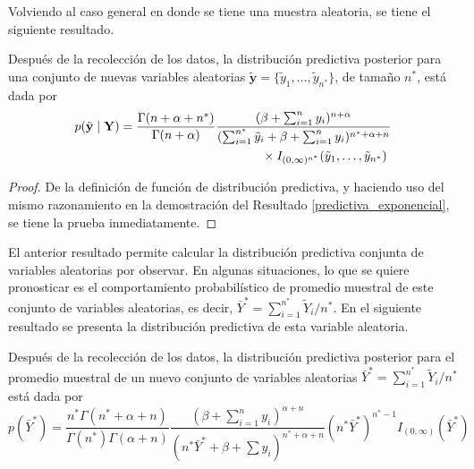 \documentclass[10pt,openright]{book}\usepackage[]{graphicx}\usepackage[]{color}
\begin{document}
    Volviendo al caso general en donde se tiene una muestra aleatoria, se tiene el siguiente resultado.
    
    \begin{Res}
    Despu\'es de la recolecci\'on de los datos, la distribuci\'on predictiva posterior para una conjunto de nuevas variables aleatorias $\tilde{\mathbf{y}}=\{\tilde{y}_1,\ldots,\tilde{y}_{n^*}\}$, de tama\~no $n^*$, est\'a dada por
    \begin{align}
    p(\tilde{\mathbf{y}} \mid \mathbf{Y})&=
    \frac{\Gamma(n+\alpha+n^{*})}{\Gamma(n+\alpha)}
    \frac{(\beta+\sum_{i=1}^ny_i)^{n+\alpha}}{(\sum_{i=1}^{n^*}\tilde{y}_i+\beta+\sum_{i=1}^ny_i)^{n^*+\alpha+n}}\notag\\
    &\hspace{4cm}\times
    I_{(0,\infty)^{n^*}}(\tilde{y}_1,\ldots,\tilde{y}_{n^*})
    \end{align}
    \end{Res}
    
    \begin{proof}
    De la definici\'on de funci\'on de distribuci\'on predictiva, y haciendo uso del mismo razonamiento en la demostraci\'on del Resultado \ref{predictiva_exponencial}, se tiene la prueba inmediatamente.
    \end{proof}
    
    El anterior resultado permite calcular la distribuci\'on predictiva conjunta de variables aleatorias por observar. En algunas situaciones, lo que se quiere pronosticar es el comportamiento probabil\'istico de promedio muestral de este conjunto de variables aleatorias, es decir, $\bar{Y}^*=\sum_{i=1}^{n^*}\tilde{Y}_i/n^{*}$. En el siguiente resultado se presenta la distribuci\'on predictiva de esta variable aleatoria.
    
    \begin{Res}\label{Res2.5.4}
    Despu\'es de la recolecci\'on de los datos, la distribuci\'on predictiva posterior para el promedio muestral de un nuevo conjunto de variables aleatorias $\bar{Y}^*=\sum_{i=1}^{n^*}\tilde{Y}_i/n^{*}$ est\'a dada por
    \begin{equation*}
    p(\bar{Y}^*)=\frac{n^*\Gamma(n^*+\alpha+n)}{\Gamma(n^*)\Gamma(\alpha+n)}\frac{(\beta+\sum_{i=1}^ny_i)^{\alpha+n}}{(n^*\bar{Y}^*+\beta+\sum y_i)^{n^*+\alpha+n}}(n^*\bar{Y}^*)^{n^*-1}I_{(0,\infty)}(\bar{Y}^*)
    \end{equation*}
    \end{Res}
    
\end{document}
